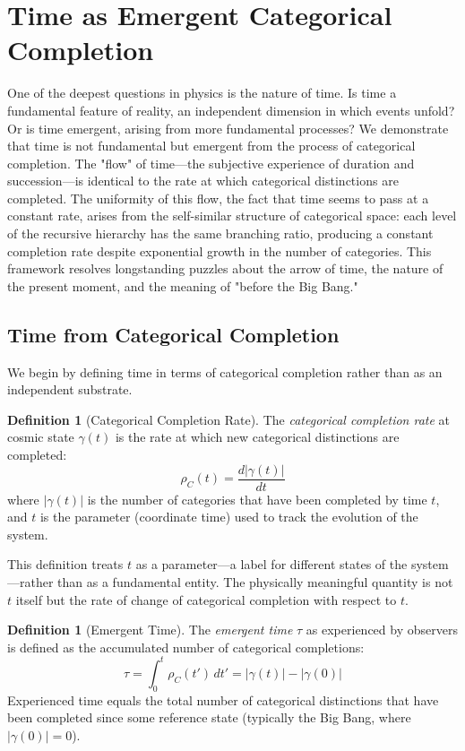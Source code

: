 \documentclass[12pt,a4paper]{article}
\theoremstyle{definition}
\newtheorem{definition}[theorem]{Definition}
\theoremstyle{remark}
\begin{document}
\section{Time as Emergent Categorical Completion}
\label{sec:time}

One of the deepest questions in physics is the nature of time. Is time a fundamental feature of reality, an independent dimension in which events unfold? Or is time emergent, arising from more fundamental processes? We demonstrate that time is not fundamental but emergent from the process of categorical completion. The "flow" of time—the subjective experience of duration and succession—is identical to the rate at which categorical distinctions are completed. The uniformity of this flow, the fact that time seems to pass at a constant rate, arises from the self-similar structure of categorical space: each level of the recursive hierarchy has the same branching ratio, producing a constant completion rate despite exponential growth in the number of categories. This framework resolves longstanding puzzles about the arrow of time, the nature of the present moment, and the meaning of "before the Big Bang."

\subsection{Time from Categorical Completion}

We begin by defining time in terms of categorical completion rather than as an independent substrate.

\begin{definition}[Categorical Completion Rate]
\label{def:completion_rate}
The \emph{categorical completion rate} at cosmic state $\gamma(t)$ is the rate at which new categorical distinctions are completed:
\begin{equation}
\rho_C(t) = \frac{d|\gamma(t)|}{dt}
\end{equation}
where $|\gamma(t)|$ is the number of categories that have been completed by time $t$, and $t$ is the parameter (coordinate time) used to track the evolution of the system.
\end{definition}

This definition treats $t$ as a parameter—a label for different states of the system—rather than as a fundamental entity. The physically meaningful quantity is not $t$ itself but the rate of change of categorical completion with respect to $t$.

\begin{definition}[Emergent Time]
\label{def:emergent_time}
The \emph{emergent time} $\tau$ as experienced by observers is defined as the accumulated number of categorical completions:
\begin{equation}
\tau = \int_0^t \rho_C(t') \, dt' = |\gamma(t)| - |\gamma(0)|
\end{equation}
Experienced time equals the total number of categorical distinctions that have been completed since some reference state (typically the Big Bang, where $|\gamma(0)| = 0$).
\end{definition}
\end{document}
